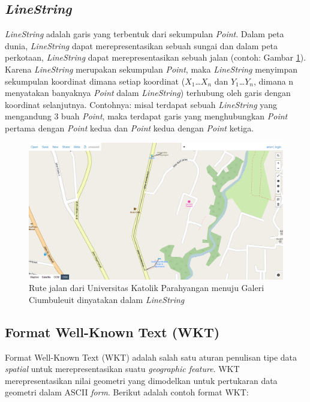 \subsection{\textit{LineString}}
\label{sec:linestring}
\textit{LineString} adalah garis yang terbentuk dari sekumpulan \textit{Point}\cite{mysqlspatial}. Dalam peta dunia, \textit{LineString} dapat merepresentasikan sebuah sungai dan dalam peta perkotaan, \textit{LineString} dapat merepresentasikan sebuah jalan (contoh: Gambar \ref{fig:2_linestring}). Karena \textit{LineString} merupakan sekumpulan \textit{Point}, maka \textit{LineString} menyimpan sekumpulan koordinat dimana setiap koordinat ($X_{1}$\ldots$X_{n}$ dan $Y_{1}$\ldots$Y_{n}$, dimana n menyatakan banyaknya \textit{Point} dalam \textit{LineString}) terhubung oleh garis dengan koordinat selanjutnya. Contohnya: misal terdapat sebuah \textit{LineString} yang mengandung 3 buah \textit{Point}, maka terdapat garis yang menghubungkan \textit{Point} pertama dengan \textit{Point} kedua dan \textit{Point} kedua dengan \textit{Point} ketiga.

\begin{figure}[htbp]
	\centering
		\includegraphics[scale=0.35]{Gambar/2_linestring.png}
	\caption{Rute jalan dari Universitas Katolik Parahyangan menuju Galeri Ciumbuleuit dinyatakan dalam \textit{LineString}\cite{geojson}}
	\label{fig:2_linestring}
\end{figure}

\subsection{Format Well-Known Text (WKT)}
\label{sec:wktformat}
Format Well-Known Text (WKT) adalah salah satu aturan penulisan tipe data \textit{spatial} untuk merepresentasikan suatu \textit{geographic feature}\cite{mysqlspatial}. WKT merepresentasikan nilai geometri yang dimodelkan untuk pertukaran data geometri dalam ASCII \textit{form}. Berikut adalah contoh format WKT:

